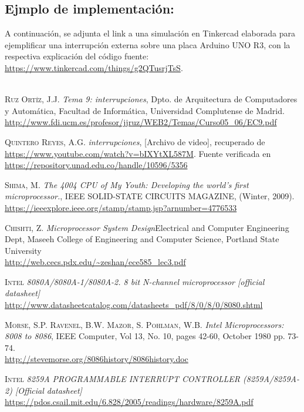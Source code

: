 \documentclass[12pt]{article}
\begin{document}
\begin{multicols}{2}
\section*{Ejmplo de implementación:}
A continuación, se adjunta el link a una simulación en Tinkercad elaborada para ejemplificar una interrupción externa sobre una placa Arduino UNO R3, con la respectiva explicación del código fuente: \url{https://www.tinkercad.com/things/g2QTusrjTsS}.\\\\
\end{multicols}
\begin{thebibliography}{x}
 \textsc{Ruz Ortíz, J.J.}
\textit{Tema 9: interrupciones}, Dpto. de Arquitectura de Computadores y Automática, Facultad de Informática,  Universidad Complutense de Madrid.\\\url{http://www.fdi.ucm.es/profesor/jjruz/WEB2/Temas/Curso05_06/EC9.pdf}

 \textsc{Quintero Reyes, A.G.}
\textit{interrupciones}, [Archivo de video], recuperado de \\\url{https://www.youtube.com/watch?v=bIXYtXL587M}. Fuente verificada en \url{https://repository.unad.edu.co/handle/10596/5356}

 \textsc{Shima, M.}
\textit{The 4004 CPU of My Youth: Developing the world’s first microprocessor.}, IEEE SOLID-STATE CIRCUITS MAGAZINE, (Winter, 2009). \\\url{https://ieeexplore.ieee.org/stamp/stamp.jsp?arnumber=4776533}

 \textsc{Chishti, Z.}
\textit{Microprocessor System Design}Electrical and Computer Engineering Dept, Maseeh College of Engineering and Computer Science, Portland State University \\\url{http://web.cecs.pdx.edu/~zeshan/ece585_lec3.pdf}

 \textsc{Intel}
\textit{8080A/8080A-1/8080A-2. 8 bit N-channel microprocessor [official datasheet]}\\\url{http://www.datasheetcatalog.com/datasheets_pdf/8/0/8/0/8080.shtml}

 \textsc{Morse, S.P. Ravenel, B.W. Mazor, S. Pohlman, W.B.}
\textit{Intel Microprocessors: 8008 to 8086}, IEEE Computer, Vol 13, No. 10, pages 42-60, October 1980 pp. 73-74. \\\url{http://stevemorse.org/8086history/8086history.doc}

 \textsc{Intel}
\textit{8259A PROGRAMMABLE INTERRUPT CONTROLLER (8259A/8259A-2) [Official datasheet]} \\\url{https://pdos.csail.mit.edu/6.828/2005/readings/hardware/8259A.pdf}


\end{thebibliography}
\end{document}
